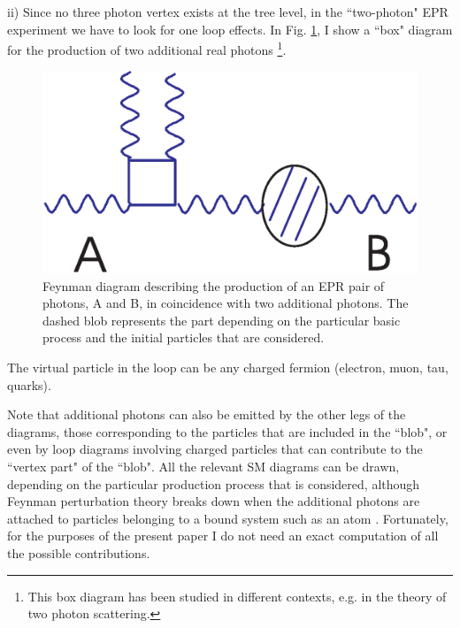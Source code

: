 \documentclass[aps,prl,showkeys,showpacs,preprint,groupedaddress]{revtex4}
\begin{document}
ii) Since no three photon vertex exists at the tree level, in the
``two-photon" EPR experiment we have to look for one loop effects.
In Fig. \ref{fig3}, I show a ``box" diagram for the production of
two additional real photons \footnote{This box diagram has been
studied in different contexts, e.g. in the theory of two photon
scattering.}.
\begin{figure}
\includegraphics{fig3.eps}
\caption{\label{fig3} Feynman diagram describing the production of
an EPR pair of photons, A and B, in coincidence with two
additional photons. The dashed blob represents the part depending
on the particular basic process and the initial particles that are
considered.}
\end{figure}
The virtual particle in the loop can be any charged fermion
(electron, muon, tau, quarks).

Note that additional photons can also be emitted by the other legs
of the diagrams, those corresponding to the particles that are
included in the ``blob", or even by loop diagrams involving
charged particles that can contribute to the ``vertex part" of the
``blob". All the relevant SM diagrams can be drawn, depending on
the particular production process that is considered, although
Feynman perturbation theory breaks down when the additional
photons are attached to particles belonging to a bound system such
as an atom \cite{WeinbookI}. Fortunately, for the purposes of the
present paper I do not need an exact computation of all the
possible contributions.
\end{document}
